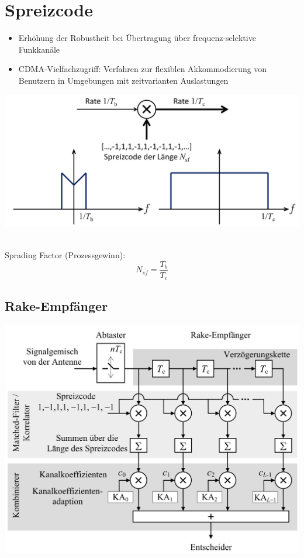 \chapter{Spreizcode}
\begin{itemize}
	\item Erhöhung der Robustheit bei Übertragung über frequenz-selektive Funkkanäle
	\item CDMA-Vielfachzugriff: Verfahren zur flexiblen Akkommodierung von Benutzern
	in Umgebungen mit zeitvarianten Auslastungen
\end{itemize}

\begin{center}
	\includegraphics[width=.9\textwidth]{./images/spreiz.png}
\end{center}
~\\
Sprading Factor (Prozessgewinn):
\[ N_{sf} = \frac{T_b}{T_c} \]

\section{Rake-Empfänger}
\begin{center}
	\includegraphics[width=.9\textwidth]{./images/rake.png}
\end{center}

